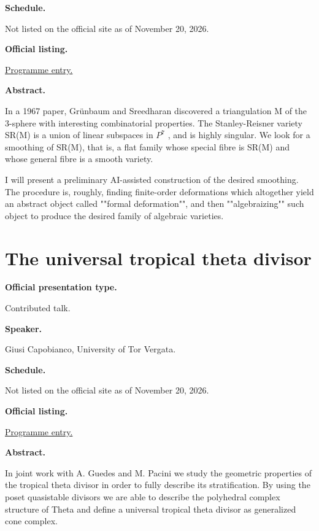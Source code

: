 \medskip\noindent
{\bf Schedule.}

Not listed on the official site as of
November 20, 2026.

\medskip\noindent
{\bf Official listing.}

\href{%
https://sites.google.com/view/%
geoalgcompluff/legal/%
legal-2027-resumos#h.dant8g3oe5ea%
}{Programme entry.}

\medskip\noindent
{\bf Abstract.}

In a 1967 paper, Grünbaum and Sreedharan
discovered a triangulation M of the 3-sphere
with interesting combinatorial properties.
The Stanley-Reisner variety SR(M) is a union
of linear subspaces in $P^7$ , and is highly
singular. We look for a smoothing of SR(M),
that is, a flat family whose special fibre is
SR(M) and whose general fibre is a smooth
variety.

I will present a preliminary AI-assisted
construction of the desired smoothing. The
procedure is, roughly, finding finite-order
deformations which altogether yield an
abstract object called ""formal
deformation"", and then ""algebraizing"" such
object to produce the desired family of
algebraic varieties.

\section{The universal tropical theta
divisor}
\label{section-the-universal-tropical-theta}

\medskip\noindent
{\bf Official presentation type.}

Contributed talk.

\medskip\noindent
{\bf Speaker.}

Giusi Capobianco, University of Tor Vergata.

\medskip\noindent
{\bf Schedule.}

Not listed on the official site as of
November 20, 2026.

\medskip\noindent
{\bf Official listing.}

\href{%
https://sites.google.com/view/%
geoalgcompluff/legal/%
legal-2027-resumos#h.dant8g3oe5ea%
}{Programme entry.}

\medskip\noindent
{\bf Abstract.}

In joint work with A. Guedes and M. Pacini we
study the geometric properties of the
tropical theta divisor in order to fully
describe its stratification. By using the
poset quasistable divisors we are able to
describe the polyhedral complex structure of
Theta and define a universal tropical theta
divisor as generalized cone complex.

